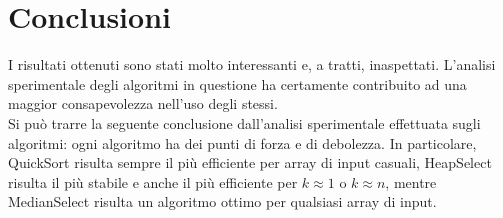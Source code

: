 \documentclass{article}
\begin{document}
	
	\newpage

	\section{Conclusioni}
	I risultati ottenuti sono stati molto interessanti e, a tratti, inaspettati. L'analisi sperimentale degli algoritmi in questione ha certamente contribuito ad una maggior consapevolezza nell'uso degli stessi.
	\\
	Si può trarre la seguente conclusione dall'analisi sperimentale effettuata sugli algoritmi: ogni algoritmo ha dei punti di forza e di debolezza. In particolare, QuickSort risulta sempre il più efficiente per array di input casuali, HeapSelect risulta il più stabile e anche il più efficiente per $k\approx 1 $ o $k \approx n$, mentre MedianSelect risulta un algoritmo ottimo per qualsiasi array di input.
	
\end{document}

